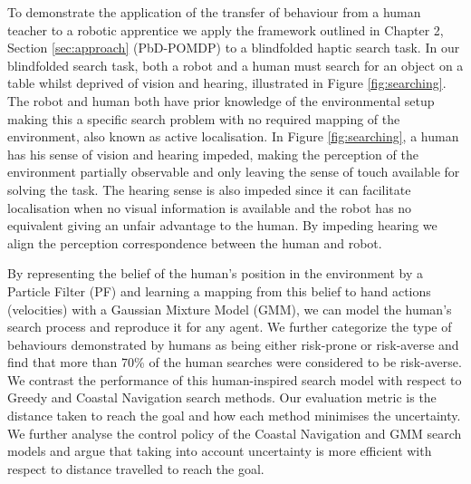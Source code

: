 To demonstrate the application of the transfer of behaviour from a human teacher to a robotic apprentice we apply the framework outlined in Chapter 2, 
Section \ref{sec:approach} (PbD-POMDP) to a blindfolded haptic search task. In our blindfolded search task, both a robot and a human 
must search for an object on a table whilst deprived of vision and hearing, illustrated in Figure \ref{fig:searching}. 
The robot and human both have prior knowledge of the environmental setup making this a specific search problem with no required mapping of the environment, also known as active localisation. 
In Figure \ref{fig:searching}, a human has his sense of vision and hearing impeded, making the perception of the environment partially observable and 
only leaving the sense of touch available for solving the task. The hearing sense is also impeded since it can 
facilitate localisation when no visual information is available and the robot has no equivalent giving an unfair 
advantage to the human. By impeding hearing we align the perception correspondence between the human and robot.

By representing the belief of the human's position in the environment by a Particle Filter (PF) and learning a mapping from this belief 
to hand actions (velocities) with a Gaussian Mixture Model (GMM), we can model the human's search process and reproduce it for any agent. 
We further categorize the type of behaviours demonstrated by humans as being either risk-prone or risk-averse and find that more than 70\% of 
the human searches were considered to be risk-averse. We contrast the performance of this human-inspired search model with respect to Greedy and Coastal Navigation search methods. 
Our evaluation metric is the distance taken to reach the goal and how each method minimises the uncertainty.
We further analyse the control policy of the Coastal Navigation and GMM search models and argue that taking 
into account uncertainty is more efficient with respect to distance travelled to reach the goal.

